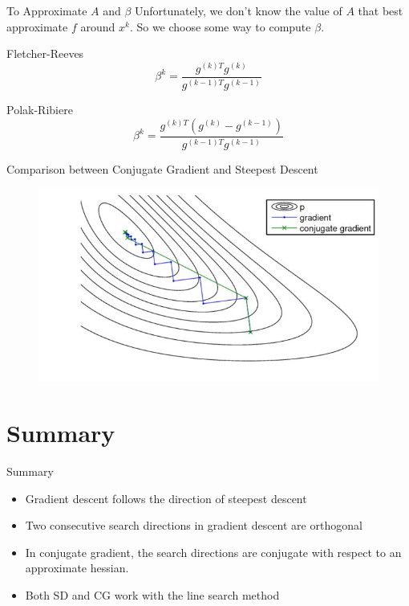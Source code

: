 \documentclass{beamer}
\begin{document}
\begin{frame}{To Approximate $A$ and $\beta$}
Unfortunately, we don't know the value of $A$ that best approximate $f$ around $x^k$. So we choose some way to compute $\beta$.

\begin{alertblock}{Fletcher-Reeves}
\begin{equation*}
    \beta^k = \frac{g^{(k)T} g^{(k)}}{g^{(k-1)T} g^{(k-1)}}
\end{equation*}
\end{alertblock}
\vfill
\begin{alertblock}{Polak-Ribiere}
\begin{equation*}
    \beta^k = \frac{g^{(k)T} (g^{(k)}-g^{(k-1)})}{g^{(k-1)T} g^{(k-1)}}
\end{equation*}
\end{alertblock}

\end{frame}


\begin{frame}{Comparison between Conjugate Gradient and Steepest Descent}
\begin{figure}
\centering
\includegraphics[width=120mm]{Figs/cg-sd.jpg}
\end{figure}
\end{frame}



\section{Summary}
\begin{frame}{Summary}
    \begin{itemize}
        \item Gradient descent follows the direction of steepest descent
        \item Two consecutive search directions in gradient descent are orthogonal
        \item In conjugate gradient, the search directions are conjugate with respect to an approximate hessian.
        \item Both SD and CG work with the line search method
    \end{itemize}
\end{frame}
\end{document}
